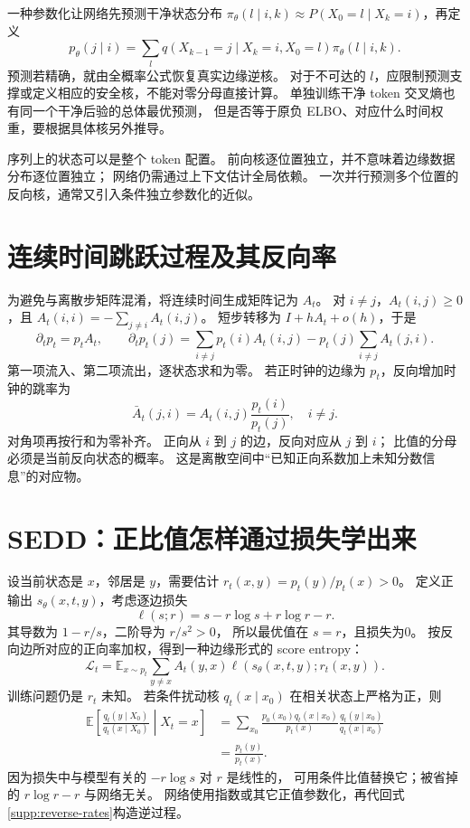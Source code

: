 一种参数化让网络先预测干净状态分布
$\pi_\theta(l\mid i,k)\approx P(X_0=l\mid X_k=i)$，再定义
\[
p_\theta(j\mid i)=\sum_l
q(X_{k-1}=j\mid X_k=i,X_0=l)\pi_\theta(l\mid i,k).
\]
预测若精确，就由全概率公式恢复真实边缘逆核。
对于不可达的 $l$，应限制预测支撑或定义相应的安全核，不能对零分母直接计算。
单独训练干净 token 交叉熵也有同一个干净后验的总体最优预测，
但是否等于原负 ELBO、对应什么时间权重，要根据具体核另外推导。

序列上的状态可以是整个 token 配置。
前向核逐位置独立，并不意味着边缘数据分布逐位置独立；
网络仍需通过上下文估计全局依赖。
一次并行预测多个位置的反向核，通常又引入条件独立参数化的近似。

\section{连续时间跳跃过程及其反向率}
为避免与离散步矩阵混淆，将连续时间生成矩阵记为 $A_t$。
对 $i\ne j$，$A_t(i,j)\geq0$，且
$A_t(i,i)=-\sum_{j\ne i}A_t(i,j)$。
短步转移为 $I+hA_t+o(h)$，于是
\[
\partial_tp_t=p_tA_t,\qquad
\partial_tp_t(j)=\sum_{i\ne j}p_t(i)A_t(i,j)
 -p_t(j)\sum_{i\ne j}A_t(j,i).
\]
第一项流入、第二项流出，逐状态求和为零。
若正时钟的边缘为 $p_t$，反向增加时钟的跳率为
\[
\bar A_t(j,i)=A_t(i,j)\frac{p_t(i)}{p_t(j)},\quad i\ne j.
\label{supp:reverse-rates}
\]
对角项再按行和为零补齐。
正向从 $i$ 到 $j$ 的边，反向对应从 $j$ 到 $i$；
比值的分母必须是当前反向状态的概率。
这是离散空间中“已知正向系数加上未知分数信息”的对应物。

\section{SEDD：正比值怎样通过损失学出来}
设当前状态是 $x$，邻居是 $y$，需要估计
$r_t(x,y)=p_t(y)/p_t(x)>0$。
定义正输出 $s_\theta(x,t,y)$，考虑逐边损失
\[
\ell(s;r)=s-r\log s+r\log r-r.
\]
其导数为 $1-r/s$，二阶导为 $r/s^2>0$，
所以最优值在 $s=r$，且损失为0。
按反向边所对应的正向率加权，得到一种边缘形式的 score entropy：
\[
\mathcal L_t=\mathbb E_{x\sim p_t}
 \sum_{y\ne x}A_t(y,x)\ell(s_\theta(x,t,y);r_t(x,y)).
\]
训练问题仍是 $r_t$ 未知。
若条件扰动核 $q_t(x\mid x_0)$ 在相关状态上严格为正，则
\begin{align}
\mathbb E\left[\frac{q_t(y\mid X_0)}{q_t(x\mid X_0)}\middle|X_t=x\right]
 &=\sum_{x_0}\frac{p_0(x_0)q_t(x\mid x_0)}{p_t(x)}
  \frac{q_t(y\mid x_0)}{q_t(x\mid x_0)}\\
 &=\frac{p_t(y)}{p_t(x)}.
\end{align}
因为损失中与模型有关的 $-r\log s$ 对 $r$ 是线性的，
可用条件比值替换它；被省掉的 $r\log r-r$ 与网络无关。
网络使用指数或其它正值参数化，再代回式\eqref{supp:reverse-rates}构造逆过程。
\cite{sedd}

